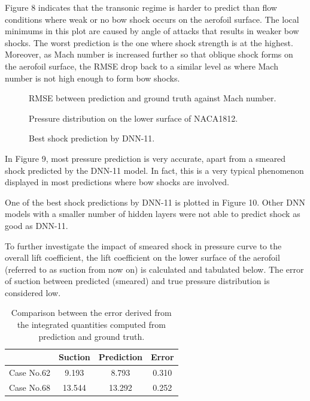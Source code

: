 \documentclass[11pt]{article}
\begin{document}
Figure 8 indicates that the transonic regime is harder to predict than flow conditions where weak or no bow shock occurs on the aerofoil surface. The local minimums in this plot are caused by angle of attacks that results in weaker bow shocks. The worst prediction is the one where shock strength is at the highest. Moreover, as Mach number is increased further so that oblique shock forms on the aerofoil surface, the RMSE drop back to a similar level as where Mach number is not high enough to form bow shocks.

\begin{figure}[htbp]
    \centering
    
    \caption{RMSE between prediction and ground truth against Mach number.}
\end{figure}

\begin{figure}[htbp]
    \centering
    
    \caption{Pressure distribution on the lower surface of NACA1812.}
\end{figure}

\begin{figure}[htbp]
    \centering
    
    \caption{Best shock prediction by DNN-11.}
\end{figure}

In Figure 9, most pressure prediction is very accurate, apart from a smeared shock predicted by the DNN-11 model. In fact, this is a very typical phenomenon displayed in most predictions where bow shocks are involved.

One of the best shock predictions by DNN-11 is plotted in Figure 10. Other DNN models with a smaller number of hidden layers were not able to predict shock as good as DNN-11.

To further investigate the impact of smeared shock in pressure curve to the overall lift coefficient, the lift coefficient on the lower surface of the aerofoil (referred to as suction from now on) is calculated and tabulated below. The error of suction between predicted (smeared) and true pressure distribution is considered low.

\begin{table}[H]
	\centering
	\caption{Comparison between the error derived from the integrated quantities computed from prediction and ground truth.}
	\label{tab:Example}
	\begin{tabular}{cccc}
		\hline
            & Suction & Prediction & Error \\ \hline
		Case No.62    & 9.193     & 8.793     & 0.310    \\
		Case No.68    & 13.544    & 13.292    & 0.252     \\ \hline
	\end{tabular}
\end{table}
\end{document}
